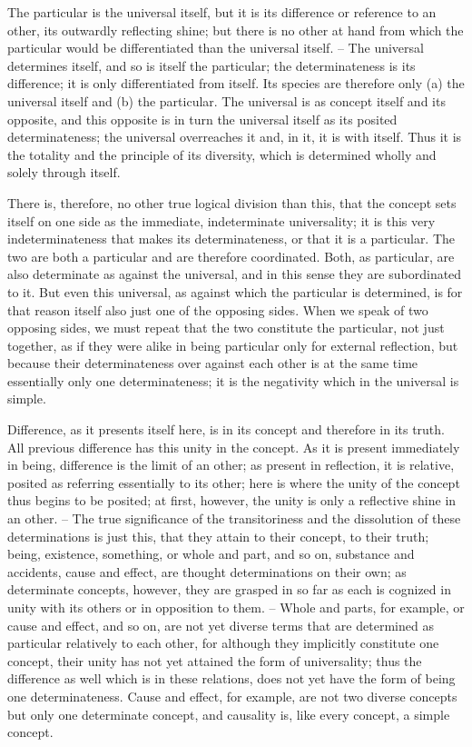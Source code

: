 The particular is the universal itself, but it is its difference or reference
to an other, its outwardly reflecting shine; but there is no other at hand from
which the particular would be differentiated than the universal itself. – The
universal determines itself, and so is itself the particular; the determinateness
is its difference; it is only differentiated from itself. Its species are therefore
only (a) the universal itself and (b) the particular. The universal is as concept
itself and its opposite, and this opposite is in turn the universal itself as
its posited determinateness; the universal overreaches it and, in it, it is
with itself. Thus it is the totality and the principle of its diversity, which is
determined wholly and solely through itself.

There is, therefore, no other true logical division than this, that the
concept sets itself on one side as the immediate, indeterminate universality;
it is this very indeterminateness that makes its determinateness, or that it
is a particular. The two are both a particular and are therefore coordinated.
Both, as particular, are also determinate as against the universal, and in
this sense they are subordinated to it. But even this universal, as against
which the particular is determined, is for that reason itself also just one
of the opposing sides. When we speak of two opposing sides, we must
repeat that the two constitute the particular, not just together, as if they
were alike in being particular only for external reflection, but because
their determinateness over against each other is at the same time essentially
only one determinateness; it is the negativity which in the universal is
simple.

Difference, as it presents itself here, is in its concept and therefore in
its truth. All previous difference has this unity in the concept. As it is
present immediately in being, difference is the limit of an other; as present
in reflection, it is relative, posited as referring essentially to its other; here is
where the unity of the concept thus begins to be posited; at first, however,
the unity is only a reflective shine in an other. – The true significance of the
transitoriness and the dissolution of these determinations is just this, that
they attain to their concept, to their truth; being, existence, something, or
whole and part, and so on, substance and accidents, cause and effect, are
thought determinations on their own; as determinate concepts, however,
they are grasped in so far as each is cognized in unity with its others or
in opposition to them. – Whole and parts, for example, or cause and
effect, and so on, are not yet diverse terms that are determined as particular
relatively to each other, for although they implicitly constitute one concept,
their unity has not yet attained the form of universality; thus the difference
as well which is in these relations, does not yet have the form of being
one determinateness. Cause and effect, for example, are not two diverse
concepts but only one determinate concept, and causality is, like every
concept, a simple concept.

